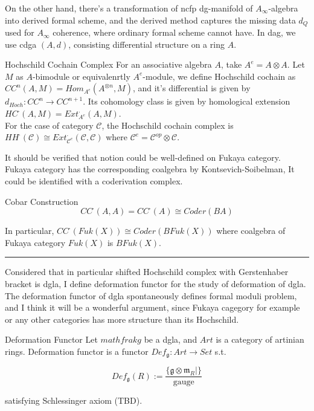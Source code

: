 \documentclass{article}
\begin{document}
\noindent
On the other hand, there's a transformation of ncfp dg-manifold of $A_\infty$-algebra into derived formal scheme,
and the derived method captures the missing data $d_Q$ used for $A_\infty$ coherence, where ordinary formal scheme cannot have.
In dag, we use cdga $(A,d)$, consisting differential structure on a ring $A$. \\


\begin{definition}{Hochschild Cochain Complex}{}
For an associative algebra $A$, take $A^e = A\otimes A$. Let $M$ as $A$-bimodule or equivalenrtly $A^e$-module, 
we define Hochschild cochain as $CC^n (A,M) = Hom_{A^e} (A^{\otimes n}, M)$,
and it's differential is given by $d_{Hoch} : CC^n \to CC^{n+1}$. 
Its cohomology class is given by homological extension $HC^\cdot (A,M) = Ext^\cdot_{A^e} (A,M)$. \\

For the case of category $\mathcal{C}$, the Hochschild cochain complex is 
$HH^\cdot (\mathcal{C}) \cong Ext_{\mathcal{C}^e}^\cdot (\mathcal{C}, \mathcal{C})$ 
where $\mathcal{C}^e= \mathcal{C}^{op}\otimes \mathcal{C}$.
\end{definition}


It should be verified that notion could be well-defined on Fukaya category.
Fukaya category has the corresponding coalgebra by Kontsevich-Soibelman, 
It could be identified with a coderivation complex.

\begin{proposition}{Cobar Construction}{}
\[ CC^\cdot (A,A) = CC^\cdot (A) \cong Coder (BA) \]

In particular, $CC^\cdot (Fuk(X)) \cong Coder (BFuk(X))$ where coalgebra of Fukaya category $Fuk(X)$ is $BFuk(X)$.
\end{proposition}


\vspace{0.5cm}
\noindent\rule{\textwidth}{0.4pt}
\vspace{0.5cm}

\noindent
Considered that in particular shifted Hochschild complex with Gerstenhaber bracket is dgla,
I define deformation functor for the study of deformation of dgla.
The deformation functor of dgla spontaneously defines formal moduli problem, and I think it will be a wonderful argument, 
since Fukaya cagegory for example or any other categories has more structure than its Hochschild. \\


\begin{definition}{Deformation Functor}{}
Let $mathfrak{g}$ be a dgla, and $Art$ is a category of artinian rings. 
Deformation functor is a functor $Def_{\mathfrak{g}}: Art \to Set$ s.t.

\[
Def_{\mathfrak{g}}(R) := \frac {\{ \mathfrak{g} \otimes \mathfrak{m}_R |  \} }{\text{gauge}} 
\]

satisfying Schlessinger axiom (TBD).
\end{definition}
\end{document}
